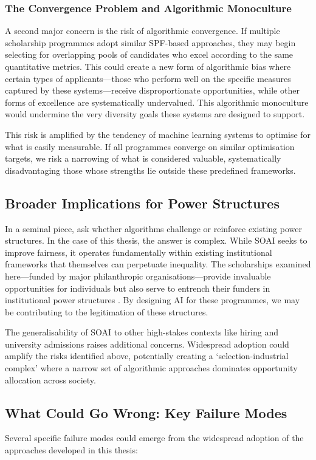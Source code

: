 \subsubsection{The Convergence Problem and Algorithmic Monoculture}
A second major concern is the risk of algorithmic convergence. If multiple scholarship programmes adopt similar SPF-based approaches, they may begin selecting for overlapping pools of candidates who excel according to the same quantitative metrics. This could create a new form of algorithmic bias where certain types of applicants—those who perform well on the specific measures captured by these systems—receive disproportionate opportunities, while other forms of excellence are systematically undervalued. This algorithmic monoculture would undermine the very diversity goals these systems are designed to support.

This risk is amplified by the tendency of machine learning systems to optimise for what is easily measurable. If all programmes converge on similar optimisation targets, we risk a narrowing of what is considered valuable, systematically disadvantaging those whose strengths lie outside these predefined frameworks.

\subsection{Broader Implications for Power Structures}
In a seminal piece, \textcite{Barocas_Hood_Ziewitz_2013} ask whether algorithms challenge or reinforce existing power structures. In the case of this thesis, the answer is complex. While SOAI seeks to improve fairness, it operates fundamentally within existing institutional frameworks that themselves can perpetuate inequality. The scholarships examined here—funded by major philanthropic organisations—provide invaluable opportunities for individuals but also serve to entrench their funders in institutional power structures \cite{Ziegler_2008}. By designing AI for these programmes, we may be contributing to the legitimation of these structures.

The generalisability of SOAI to other high-stakes contexts like hiring and university admissions raises additional concerns. Widespread adoption could amplify the risks identified above, potentially creating a `selection-industrial complex' where a narrow set of algorithmic approaches dominates opportunity allocation across society.

\subsection{What Could Go Wrong: Key Failure Modes}\label{ssec:wrongs}
Several specific failure modes could emerge from the widespread adoption of the approaches developed in this thesis:

